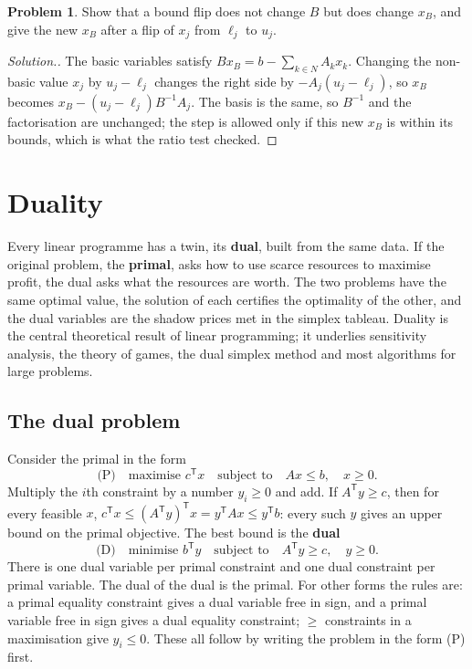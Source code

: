\documentclass[11pt,a4paper]{article}
\numberwithin{equation}{section}
\theoremstyle{definition}
\newtheorem{problemx}{Problem}[subsection]
\newenvironment{problem}{\begin{problemx}}{\end{problemx}}
\newenvironment{solution}
  {\renewcommand{\qedsymbol}{}\begin{proof}[\textit{Solution}.]}
  {\end{proof}}
\begin{document}
\begin{problem}
Show that a bound flip does not change $B$ but does change $x_B$, and give the new $x_B$ after a flip of $x_j$ from $\ell_j$ to $u_j$.
\end{problem}

\begin{solution}
The basic variables satisfy $Bx_B = b - \sum_{k \in N}A_kx_k$. Changing the non-basic value $x_j$ by $u_j - \ell_j$ changes the right side by $-A_j(u_j - \ell_j)$, so $x_B$ becomes $x_B - (u_j - \ell_j)B^{-1}A_j$. The basis is the same, so $B^{-1}$ and the factorisation are unchanged; the step is
allowed only if this new $x_B$ is within its bounds, which is what the ratio test checked.
\end{solution}

\section{Duality}
\label{sec:duality}

Every linear programme has a twin, its \textbf{dual}, built from the same data. If the original problem, the \textbf{primal}, asks how to use scarce resources to maximise profit, the dual asks what the resources are worth. The two problems have the same optimal value, the solution of each certifies the optimality of the
other, and the dual variables are the shadow prices met in the simplex tableau. Duality is the central theoretical result of linear programming; it underlies sensitivity analysis, the theory of games, the dual simplex method and most algorithms for large problems.

\subsection{The dual problem}
\label{ssec:dualproblem}

Consider the primal in the form
\[
\text{(P)}\quad\text{maximise } c^{\mathsf T}x \quad\text{subject to}\quad Ax \leq b, \quad x \geq 0 .
\]
Multiply the $i$th constraint by a number $y_i \geq 0$ and add. If $A^{\mathsf T}y \geq c$, then for every feasible $x$, $c^{\mathsf T}x \leq (A^{\mathsf T}y)^{\mathsf T}x = y^{\mathsf T}Ax \leq y^{\mathsf T}b$: every such $y$ gives an upper bound on the primal objective. The best bound is the \textbf{dual}
\[
\text{(D)}\quad\text{minimise } b^{\mathsf T}y \quad\text{subject to}\quad A^{\mathsf T}y \geq c, \quad y \geq 0 .
\]
There is one dual variable per primal constraint and one dual constraint per primal variable. The dual of the dual is the primal. For other forms the rules are: a primal equality constraint gives a dual variable free in sign, and a primal variable free in sign gives a dual equality constraint; $\geq$ constraints in a
maximisation give $y_i \leq 0$. These all follow by writing the problem in the form (P) first.
\end{document}
